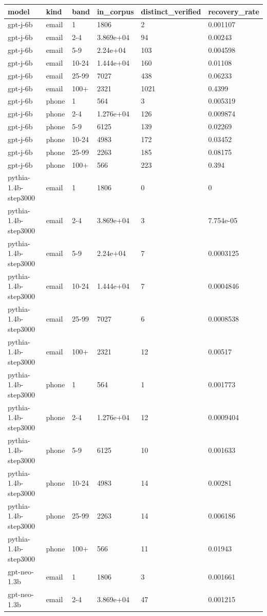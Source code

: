 \begin{tabular}{llllll}
\toprule
model & kind & band & in\_corpus & distinct\_verified & recovery\_rate \\
\midrule
gpt-j-6b & email & 1 & 1806 & 2 & 0.001107 \\
gpt-j-6b & email & 2-4 & 3.869e+04 & 94 & 0.00243 \\
gpt-j-6b & email & 5-9 & 2.24e+04 & 103 & 0.004598 \\
gpt-j-6b & email & 10-24 & 1.444e+04 & 160 & 0.01108 \\
gpt-j-6b & email & 25-99 & 7027 & 438 & 0.06233 \\
gpt-j-6b & email & 100+ & 2321 & 1021 & 0.4399 \\
gpt-j-6b & phone & 1 & 564 & 3 & 0.005319 \\
gpt-j-6b & phone & 2-4 & 1.276e+04 & 126 & 0.009874 \\
gpt-j-6b & phone & 5-9 & 6125 & 139 & 0.02269 \\
gpt-j-6b & phone & 10-24 & 4983 & 172 & 0.03452 \\
gpt-j-6b & phone & 25-99 & 2263 & 185 & 0.08175 \\
gpt-j-6b & phone & 100+ & 566 & 223 & 0.394 \\
pythia-1.4b-step3000 & email & 1 & 1806 & 0 & 0 \\
pythia-1.4b-step3000 & email & 2-4 & 3.869e+04 & 3 & 7.754e-05 \\
pythia-1.4b-step3000 & email & 5-9 & 2.24e+04 & 7 & 0.0003125 \\
pythia-1.4b-step3000 & email & 10-24 & 1.444e+04 & 7 & 0.0004846 \\
pythia-1.4b-step3000 & email & 25-99 & 7027 & 6 & 0.0008538 \\
pythia-1.4b-step3000 & email & 100+ & 2321 & 12 & 0.00517 \\
pythia-1.4b-step3000 & phone & 1 & 564 & 1 & 0.001773 \\
pythia-1.4b-step3000 & phone & 2-4 & 1.276e+04 & 12 & 0.0009404 \\
pythia-1.4b-step3000 & phone & 5-9 & 6125 & 10 & 0.001633 \\
pythia-1.4b-step3000 & phone & 10-24 & 4983 & 14 & 0.00281 \\
pythia-1.4b-step3000 & phone & 25-99 & 2263 & 14 & 0.006186 \\
pythia-1.4b-step3000 & phone & 100+ & 566 & 11 & 0.01943 \\
gpt-neo-1.3b & email & 1 & 1806 & 3 & 0.001661 \\
gpt-neo-1.3b & email & 2-4 & 3.869e+04 & 47 & 0.001215 \\

\end{tabular}
